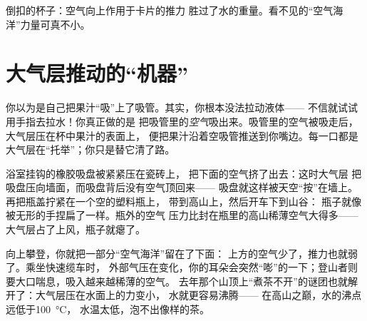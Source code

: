\begin{omfigure}

{\small 倒扣的杯子：空气向上作用于卡片的推力
胜过了水的重量。看不见的“空气海洋”力量可真不小。}
\end{omfigure}

\section{大气层推动的“机器”}

\begin{example}[吸管]\label{ex:g5:air-pressure-weather:straw}
你以为是自己把果汁“吸”上了吸管。其实，你根本没法拉动液体——
不信就试试用手指去拉水！你真正做的是
把吸管里的\emph{空气}吸出来。吸管里的空气被吸走后，
大气层压在杯中果汁的表面上，
便把果汁沿着空吸管推送到你嘴边。每一口都是
大气层在“托举”；你只是替它清了路。
\end{example}

\begin{example}[吸盘与被压扁的瓶子]\label{ex:g5:air-pressure-weather:suction}
浴室挂钩的橡胶吸盘被紧紧压在瓷砖上，
把下面的空气挤了出去：这时大气层
把吸盘压向墙面，而吸盘背后没有空气顶回来——
吸盘就这样被天空“按”在墙上。再把瓶盖拧紧在一个空的塑料瓶上，
带到高山上，然后开车下到山谷：
瓶子就像被无形的手捏扁了一样。瓶外的空气
压力比封在瓶里的高山稀薄空气大得多——
大气层占了上风，瓶子就瘪了。
\end{example}

\begin{example}[越高越稀薄]\label{ex:g5:air-pressure-weather:height}
向上攀登，你就把一部分“空气海洋”留在了下面：
上方的空气少了，推力也就弱了。乘坐快速缆车时，
外部气压在变化，你的耳朵会突然“嘭”的一下；登山者则要大口喘息，吸入越来越稀薄的空气。
去年那个山顶上“煮茶不开”的谜团也就解开了：大气层压在水面上的力变小，
水就更容易沸腾——
在高山之巅，水的沸点远低于\qty{100}{\celsius}，
水温太低，泡不出像样的茶。
\end{example}

